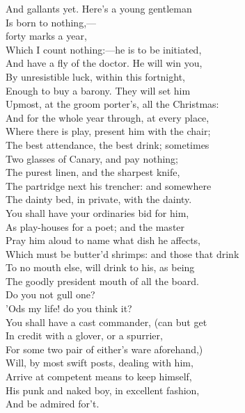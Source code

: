 \documentclass[a4paper,oneside]{memoir}
\begin{document}
\begin{drama*}
And gallants yet. Here's a young gentleman\\
Is born to nothing,---\\
 forty marks a year,\\
Which I count nothing:---he is to be initiated,\\
And have a fly of the doctor. He will win you,\\
By unresistible luck, within this fortnight,\\
Enough to buy a barony. They will set him\\
Upmost, at the groom porter's, all the Christmas:\\
And for the whole year through, at every place,\\
Where there is play, present him with the chair;\\
The best attendance, the best drink; sometimes\\
Two glasses of Canary, and pay nothing;\\
The purest linen, and the sharpest knife,\\
The partridge next his trencher: and somewhere\\
The dainty bed, in private, with the dainty.\\
You shall have your ordinaries bid for him,\\
As play-houses for a poet; and the master\\
Pray him aloud to name what dish he affects,\\
Which must be butter'd shrimps: and those that drink\\
To no mouth else, will drink to his, as being\\
The goodly president mouth of all the board.\\
\kastrilspeaks Do you not gull one?\\
\facespeaks {} 'Ods my life! do you think it?\\
You shall have a cast commander, (can but get\\
In credit with a glover, or a spurrier,\\
For some two pair of either's ware aforehand,)\\
Will, by most swift posts, dealing with him,\\
Arrive at competent means to keep himself,\\
His punk and naked boy, in excellent fashion,\\
And be admired for't.\\

\end{drama*}
\end{document}
